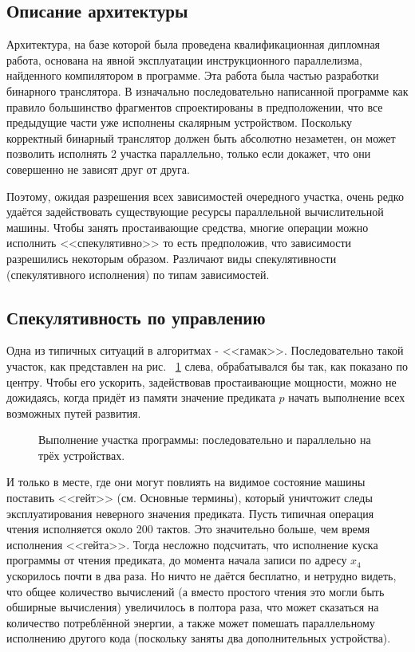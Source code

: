 \documentclass[a4paper,12pt,titlepage]{article}
\newcommand*{\fig}[1]{рис. ~{\ref{fig:#1}}}
\begin{document}
\subsection{Описание архитектуры}
Архитектура, на базе которой была проведена квалификационная дипломная работа, основана на явной эксплуатации инструкционного параллелизма, найденного компилятором в программе. Эта работа была частью разработки бинарного транслятора. В изначально последовательно написанной программе как правило большинство фрагментов спроектированы в предположении, что все предыдущие части уже исполнены скалярным устройством. Поскольку корректный бинарный транслятор должен быть абсолютно незаметен, он может позволить исполнять 2 участка параллельно, только если докажет, что они совершенно не зависят друг от друга.

Поэтому, ожидая разрешения всех зависимостей очередного участка, очень редко удаётся задействовать существующие ресурсы параллельной вычислительной машины. Чтобы занять простаивающие средства, многие операции можно исполнить <<спекулятивно>> то есть предположив, что зависимости разрешились некоторым образом. Различают виды спекулятивности (спекулятивного исполнения) по типам зависимостей.

\subsection{Спекулятивность по управлению}
Одна из типичных ситуаций в алгоритмах - <<гамак>>. Последовательно такой участок, как представлен на \fig{cfg-spec} слева, обрабатывался бы так, как показано по центру. Чтобы его ускорить, задействовав простаивающие мощности, можно не дожидаясь, когда придёт из памяти значение предиката $p$ начать выполнение всех возможных путей развития.
\begin{figure}[h]
	\begin{minipage}[h]{0.32\linewidth}
		\centering
		
		\caption{Выполнение участка программы: последовательно и параллельно на трёх устройствах.}
	\end{minipage}
	\begin{minipage}[h]{0.57\linewidth}
		\centering
		 
	\end{minipage}
	\label{fig:cfg-spec}
\end{figure}
 И только в месте, где они могут повлиять на видимое состояние машины поставить <<гейт>> (см. Основные термины), который уничтожит следы эксплуатирования неверного значения предиката. Пусть типичная операция чтения исполняется около 200 тактов. Это значительно больше, чем время исполнения <<гейта>>. Тогда несложно подсчитать, что исполнение куска программы от чтения предиката, до момента начала записи по адресу $x_4$ ускорилось почти в два раза.
Но ничто не даётся бесплатно, и нетрудно видеть, что общее количество вычислений (а вместо простого чтения это могли быть обширные вычисления) увеличилось в полтора раза, что может сказаться на количество потреблённой энергии, а также может помешать параллельному исполнению другого кода (поскольку заняты два дополнительных устройства).
\end{document}
